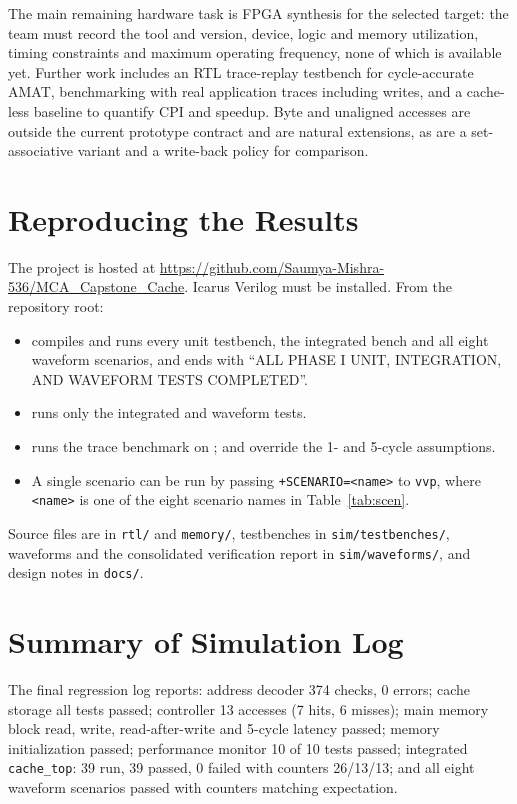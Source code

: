 \documentclass[conference,a4paper]{IEEEtran}
\begin{document}
The main remaining hardware task is FPGA synthesis for the selected target: the team must record the tool and version, device, logic and memory utilization, timing constraints and maximum operating frequency, none of which is available yet. Further work includes an RTL trace-replay testbench for cycle-accurate AMAT, benchmarking with real application traces including writes, and a cache-less baseline to quantify CPI and speedup. Byte and unaligned accesses are outside the current prototype contract and are natural extensions, as are a set-associative variant and a write-back policy for comparison.

\appendices
\section{Reproducing the Results}\label{app:repro}
The project is hosted at \url{https://github.com/Saumya-Mishra-536/MCA_Capstone_Cache}. Icarus Verilog \cite{icarus} must be installed. From the repository root:
\begin{itemize}
\item {} compiles and runs every unit testbench, the integrated bench and all eight waveform scenarios, and ends with ``ALL PHASE I UNIT, INTEGRATION, AND WAVEFORM TESTS COMPLETED''.
\item {} runs only the integrated and waveform tests.
\item {} runs the trace benchmark \cite{script} on  \cite{traces};  and  override the 1- and 5-cycle assumptions.
\item A single scenario can be run by passing \texttt{+SCENARIO=<name>} to \texttt{vvp}, where \texttt{<name>} is one of the eight scenario names in Table~\ref{tab:scen}.
\end{itemize}
Source files are in \texttt{rtl/} and \texttt{memory/}, testbenches in \texttt{sim/testbenches/}, waveforms and the consolidated verification report in \texttt{sim/waveforms/}, and design notes in \texttt{docs/}.

\section{Summary of Simulation Log}
The final regression log reports: address decoder 374 checks, 0 errors; cache storage all tests passed; controller 13 accesses (7 hits, 6 misses); main memory block read, write, read-after-write and 5-cycle latency passed; memory initialization passed; performance monitor 10 of 10 tests passed; integrated \texttt{cache\_top}: 39 run, 39 passed, 0 failed with counters 26/13/13; and all eight waveform scenarios passed with counters matching expectation.
\end{document}
